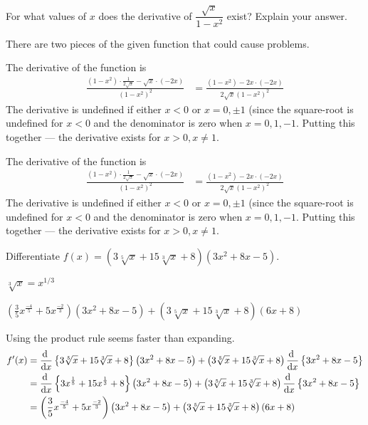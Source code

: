 \begin{Mquestion}[2015Q]
For what values of $x$ does the derivative of
$\dfrac{\sqrt{x}}{1-x^2}$ exist? Explain your answer.
\end{Mquestion}
\begin{hint} There are two pieces of the given function that could cause problems.
\end{hint}
\begin{answer}
The derivative of the function is
\begin{align*}
 \frac{(1-x^2)\cdot\frac{1}{2\sqrt{x}} - \sqrt{x} \cdot (-2x)}{(1-x^2)^2}
  &= \frac{(1-x^2) - 2x \cdot (-2x)}{2\sqrt{x}(1-x^2)^2}
\end{align*}
The derivative is undefined if either $x<0$ or $x = 0,\pm 1$ (since the square-root is
undefined for $x<0$ and the denominator is zero when $x=0,1,-1$. Putting this together
--- the derivative exists for $x>0, x\neq 1$.
\end{answer}
\begin{solution}
The derivative of the function is
\begin{align*}
 \frac{(1-x^2)\cdot\frac{1}{2\sqrt{x}} - \sqrt{x} \cdot (-2x)}{(1-x^2)^2}
  &= \frac{(1-x^2) - 2x \cdot (-2x)}{2\sqrt{x}(1-x^2)^2}
\end{align*}
The derivative is undefined if either $x<0$ or $x = 0,\pm 1$ (since the square-root is
undefined for $x<0$ and the denominator is zero when $x=0,1,-1$. Putting this together
--- the derivative exists for $x>0, x\neq 1$.
\end{solution}


\begin{question} Differentiate $f(x)=\left(3\sqrt[5]{x}+15\sqrt[3]{x}+8\right)\left(3x^2+8x-5\right)$.
\end{question}
\begin{hint} $\sqrt[3]{x}=x^{1/3}$
\end{hint}
\begin{answer} $\left(\frac{3}{5}{x}^{\frac{-4}{5}}+5{x}^{\frac{-2}{3}}\right)\left(3x^2+8x-5\right)+
\left(3\sqrt[5]{x}+15\sqrt[3]{x}+8\right)\left(6x+8\right)$
\end{answer}
\begin{solution} Using the product rule seems faster than expanding.
\begin{align*}
f'(x)&=\diff{}{x}\left\{3\sqrt[5]{x}+15\sqrt[3]{x}+8\right\}\left(3x^2+8x-5\right)+
\left(3\sqrt[5]{x}+15\sqrt[3]{x}+8\right)\diff{}{x}\left\{3x^2+8x-5\right\}\\
&=\diff{}{x}\left\{3{x}^{\frac{1}{5}}+15{x}^{\frac{1}{3}}+8\right\}\left(3x^2+8x-5\right)+
\left(3\sqrt[5]{x}+15\sqrt[3]{x}+8\right)\diff{}{x}\left\{3x^2+8x-5\right\}\\
&=\left(\frac{3}{5}{x}^{\frac{-4}{5}}+5{x}^{\frac{-2}{3}}\right)\left(3x^2+8x-5\right)+
\left(3\sqrt[5]{x}+15\sqrt[3]{x}+8\right)\left(6x+8\right)
\end{align*}
\end{solution}

